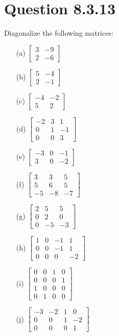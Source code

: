 \documentclass[12pt]{article}
\begin{document}
\newpage
\section*{Question 8.3.13}
Diagonalize the following matrices:
\begin{itemize}
    \item[(a)] \( \begin{bmatrix} 3 & -9 \\ 2 & -6 \end{bmatrix} \)
    \item[(b)] \( \begin{bmatrix} 5 & -4 \\ 2 & -1 \end{bmatrix} \)
    \item[(c)] \( \begin{bmatrix} -4 & -2 \\ 5 & 2 \end{bmatrix} \)
    \item[(d)] \( \begin{bmatrix} -2 & 3 & 1 \\ 0 & 1 & -1 \\ 0 & 0 & 3 \end{bmatrix} \)
    \item[(e)] \( \begin{bmatrix} -3 & 0 & -1 \\ 3 & 0 & -2 \end{bmatrix} \)
    \item[(f)] \( \begin{bmatrix} 3 & 3 & 5 \\ 5 & 6 & 5 \\ -5 & -8 & -7 \end{bmatrix} \)
    \item[(g)] \( \begin{bmatrix} 2 & 5 & 5 \\ 0 & 2 & 0 \\ 0 & -5 & -3 \end{bmatrix} \)
    \item[(h)] \( \begin{bmatrix} 1 & 0 & -1 & 1 \\ 0 & 0 & -1 & 1 \\ 0 & 0 & 0 & -2 \end{bmatrix} \)
    \item[(i)] \( \begin{bmatrix} 0 & 0 & 1 & 0 \\ 0 & 0 & 0 & 1 \\ 1 & 0 & 0 & 0 \\ 0 & 1 & 0 & 0 \end{bmatrix} \)
    \item[(j)] \( \begin{bmatrix} -3 & -2 & 1 & 0 \\ 0 & 0 & 1 & -2 \\ 0 & 0 & 0 & 1 \end{bmatrix} \)
\end{itemize}
\end{document}
